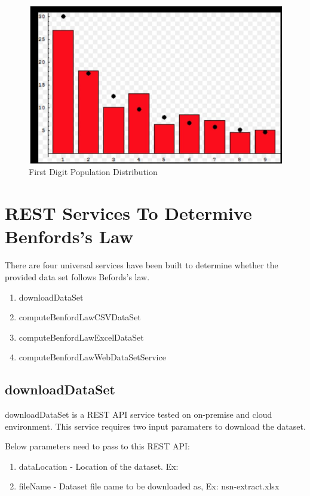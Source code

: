 \begin{figure}[!ht]
\centering\includegraphics[width=\columnwidth]{images/benford_country.JPG}
  \caption{First Digit Population Distribution}\label{f:populcation-dist-200-countries}
\end{figure}

\section{REST Services To Determive Benfords's Law}

There are four universal services have been built to determine
whether the provided data set follows Befords's law.

\begin{enumerate}
 \item downloadDataSet
 \item computeBenfordLawCSVDataSet
 \item computeBenfordLawExcelDataSet
 \item computeBenfordLawWebDataSetService
\end{enumerate}


\subsection{downloadDataSet}
downloadDataSet is a REST API service tested on 
on-premise and cloud environment. This service requires two 
input paramaters to download the dataset.

Below parameters need to pass to this REST API:

\begin{enumerate}
\item dataLocation - Location of the dataset. 
 Ex:~\cite{hid-sp18-514-excelDatalocation}
\item fileName - Dataset file name to be downloaded 
 as, Ex: nsn-extract.xlsx
\end{enumerate}


